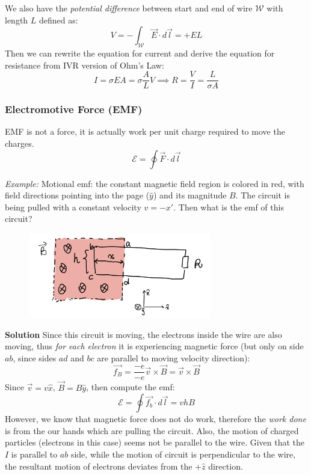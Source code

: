 \documentclass[12pt,a4paper,twoside]{article}
\numberwithin{equation}{section}
\begin{document}
\noindent We also have the \textit{potential difference} between start and end of wire $\mathcal{W}$ with length $L$ defined as:
\[V=-\int_{\mathcal{W}}\overrightarrow{E}\cdot d\overrightarrow{l}=+EL\]
Then we can rewrite the equation for current and derive the equation for resistance from IVR version of Ohm's Law:
\[I=\sigma EA=\sigma\frac{A}{L}V\implies R=\frac{V}{I}=\frac{L}{\sigma A}\]

\subsubsection{Electromotive Force (EMF)}
EMF is not a force, it is actually work per unit charge required to move the charges.
\begin{equation}
    \mathcal{E} = \oint\overrightarrow{F}\cdot d\overrightarrow{l}
    \label{eq: emf-definition}
\end{equation}

\noindent \textit{Example:} Motional emf: the constant magnetic field region is colored in red, with field directions pointing into the page ($\hat{y}$) and its magnitude $B$. The circuit is being pulled with a constant velocity $v=-x'$. Then what is the emf of this circuit?\\
\begin{figure}[ht]
    \centering
    \includegraphics[width=8cm]{250-Revision/motional-emf.png}
\end{figure}

\noindent \textbf{Solution} Since this circuit is moving, the electrons inside the wire are also moving, thus \textit{for each electron} it is experiencing magnetic force (but only on side $ab$, since sides $ad$ and $bc$ are parallel to moving velocity direction):
\[\overrightarrow{f_B}=\frac{-e}{-e}\overrightarrow{v}\times \overrightarrow{B}=\overrightarrow{v}\times \overrightarrow{B}\]
Since $\overrightarrow{v}=v\hat{x}$, $\overrightarrow{B}=B\hat{y}$, then compute the emf:
\[\mathcal{E}=\oint\overrightarrow{f_b}\cdot d\overrightarrow{l}=vhB\]
However, we know that magnetic force does not do work, therefore the \textit{work done} is from the our hands which are pulling the circuit. Also, the motion of charged particles (electrons in this case) seems not be parallel to the wire. Given that the $I$ is parallel to $ab$ side, while the motion of circuit is perpendicular to the wire, the resultant motion of electrons deviates from the $+\hat{z}$ direction.
\end{document}
